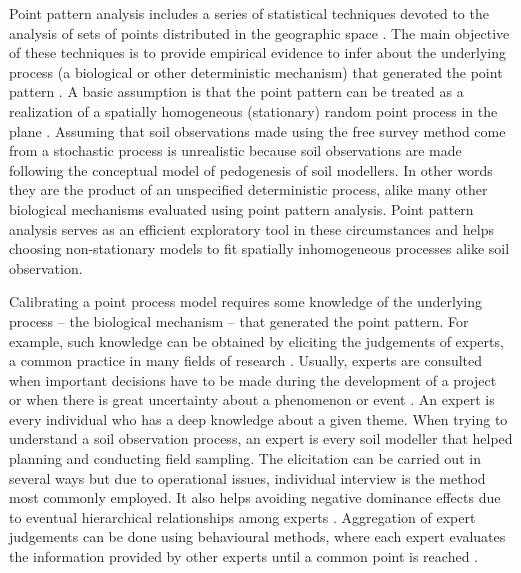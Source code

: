 Point pattern analysis includes a series of statistical techniques devoted to the analysis of sets of points 
distributed in the geographic space \cite{Diggle2003}. The main objective of these 
techniques is to provide empirical evidence to infer about the underlying process (a biological or other 
deterministic
mechanism) that generated the point pattern \cite{BivandEtAl2008}. A basic assumption is that the point pattern
can be treated as a realization of a spatially homogeneous (stationary) random point process in the plane 
\cite{Diggle2003}. Assuming that soil observations made using the free survey method come from a stochastic 
process is unrealistic because soil observations are made following the conceptual model of pedogenesis of soil
modellers. In other words they are the product of an unspecified deterministic process, alike many other 
biological mechanisms evaluated using point pattern analysis. Point pattern analysis serves as an efficient 
exploratory tool in these circumstances and helps choosing non-stationary models to fit spatially inhomogeneous
processes \cite{Baddeley2010} alike soil observation.

Calibrating a point process model requires some knowledge of the underlying process -- the biological 
mechanism -- that generated the point pattern. For example, such knowledge can be obtained by eliciting the 
judgements of experts, a common practice in many fields of research \cite{OHaganEtAl2006}. Usually, experts 
are consulted when important decisions have to be made during the development of a project or when there is 
great uncertainty about a phenomenon or event \cite{MeyerEtAl2001}. An expert is every 
individual who has a deep knowledge about a given theme. When trying to understand a soil observation process,
an expert is every soil modeller that helped planning and conducting field sampling. The elicitation can be 
carried out in several ways \cite{Cooke1991, MeyerEtAl2001, OHaganEtAl2006} but due to operational issues, 
individual interview is the method most commonly employed. It also helps avoiding negative dominance effects 
due to eventual hierarchical relationships among experts \cite{Cooke1991}. Aggregation of expert judgements 
can 
be done using behavioural methods, where each expert evaluates the information provided by other experts until 
a common point is reached \cite{OrsiEtAl2011}.

